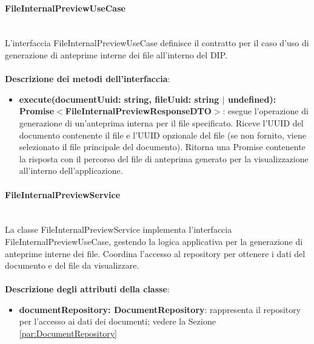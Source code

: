 \documentclass[a4paper,12pt]{article}
\begin{document}
{{{                \paragraph{FileInternalPreviewUseCase}\label{par:FileInternalPreviewUseCase}\mbox{}\\
                L'interfaccia FileInternalPreviewUseCase definisce il contratto per il caso d'uso di generazione di anteprime interne dei file all'interno del DIP.\\
                \\
              \noindent \textbf{Descrizione dei metodi dell'interfaccia}:
                \begin{itemize}
                    \item \textbf{execute(documentUuid: string, fileUuid: string $|$ undefined):\\ Promise$<$FileInternalPreviewResponseDTO$>$}: esegue l'operazione di generazione di un'anteprima interna per il file specificato. Riceve l'UUID del documento contenente il file e l'UUID opzionale del file (se non fornito, viene selezionato il file principale del documento). Ritorna una Promise contenente la risposta con il percorso del file di anteprima generato per la visualizzazione all’interno dell’applicazione.
                \end{itemize}
                \paragraph{FileInternalPreviewService}\label{par:FileInternalPreviewService}\mbox{}\\
                La classe FileInternalPreviewService implementa l'interfaccia FileInternalPreviewUseCase, gestendo la logica applicativa per la generazione di anteprime interne dei file. Coordina l'accesso al repository per ottenere i dati del documento e del file da visualizzare.\\
                \\
                \textbf{Descrizione degli attributi della classe}:
                \begin{itemize}
                    \item \textbf{documentRepository: DocumentRepository}: rappresenta il repository per l'accesso ai dati dei documenti; vedere la Sezione \ref{par:DocumentRepository}
                \end{itemize}
                
}}}
\end{document}
